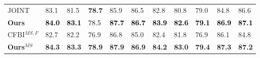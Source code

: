 \documentclass[letterpaper]{article} \usepackage{aaai22}  \usepackage{times}  \usepackage{helvet}  \usepackage{courier}  \usepackage[hyphens]{url}  \usepackage{graphicx} \urlstyle{rm} \def\UrlFont{\rm}  \usepackage{natbib}  \usepackage{caption} \DeclareCaptionStyle{ruled}{labelfont=normalfont,labelsep=colon,strut=off} \frenchspacing  \setlength{\pdfpagewidth}{8.5in}  \setlength{\pdfpageheight}{11in}  \usepackage{algorithm}
\begin{document}
\begin{table*}[ht]
{\begin{tabular}{llllll|lllll}
        JOINT {\cite{mao2021joint}}&    83.1 & 81.5 &\textbf{78.7}&85.9&86.5 & 82.8 & 80.8 &79.0&84.8&86.6     \\
		\textbf{Ours}        &   \textcolor{black}{\textbf{{84.0}}} & \textcolor{black}{\textbf{83.1}} & \textcolor{black}{{78.5}} & \textcolor{black}{\textbf{87.7}}  & \textcolor{black}{\textbf{86.7}} &   \textcolor{black}{\textbf{83.9}} & \textcolor{black}{\textbf{82.6}} & \textcolor{black}{\textbf{79.1}} & \textcolor{black}{\textbf{86.9}}  & \textcolor{black}{\textbf{87.1}}\\
        \midrule
	    CFBI${}^{MS,F}$ {\cite{yang2020collaborative}}&    82.7 & 82.2  & 76.9 & 86.8  & 85.0  &      82.4 & 81.8 & 76.9 & 86.1  & 84.8   \\	
		\textbf{Ours${}^{MS}$} &\textbf{84.3} & \textbf{83.3}&\textbf{78.9}&\textbf{87.9} &\textbf{86.9}  & \textbf{84.2} & \textbf{83.0}  & \textbf{79.4} &\textbf{87.3}  &    \textbf{87.2}  \\	
		\bottomrule
	\end{tabular}

    }
	\label{table:ytb}
\end{table*}
\end{document}
